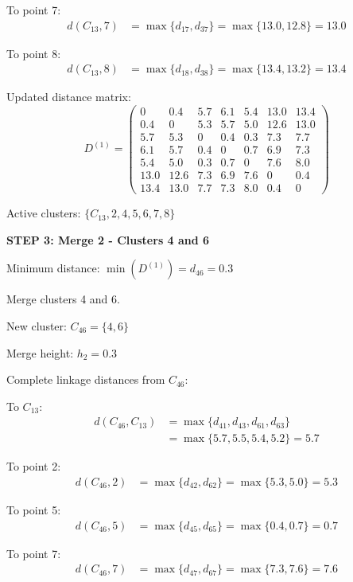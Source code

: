 \documentclass[12pt]{article}
\begin{document}
\begin{solution}
To point 7:
\begin{align*}
d(C_{13}, 7) &= \max\{d_{17}, d_{37}\} = \max\{13.0, 12.8\} = 13.0
\end{align*}

To point 8:
\begin{align*}
d(C_{13}, 8) &= \max\{d_{18}, d_{38}\} = \max\{13.4, 13.2\} = 13.4
\end{align*}

Updated distance matrix:
\[
D^{(1)} = \begin{pmatrix}
0 & 0.4 & 5.7 & 6.1 & 5.4 & 13.0 & 13.4 \\
0.4 & 0 & 5.3 & 5.7 & 5.0 & 12.6 & 13.0 \\
5.7 & 5.3 & 0 & 0.4 & 0.3 & 7.3 & 7.7 \\
6.1 & 5.7 & 0.4 & 0 & 0.7 & 6.9 & 7.3 \\
5.4 & 5.0 & 0.3 & 0.7 & 0 & 7.6 & 8.0 \\
13.0 & 12.6 & 7.3 & 6.9 & 7.6 & 0 & 0.4 \\
13.4 & 13.0 & 7.7 & 7.3 & 8.0 & 0.4 & 0
\end{pmatrix}
\]

Active clusters: $\{C_{13}, 2, 4, 5, 6, 7, 8\}$

\textbf{STEP 3: Merge 2 - Clusters 4 and 6}

Minimum distance: $\min(D^{(1)}) = d_{46} = 0.3$

Merge clusters 4 and 6.

New cluster: $C_{46} = \{4, 6\}$

Merge height: $h_2 = 0.3$

Complete linkage distances from $C_{46}$:

To $C_{13}$:
\begin{align*}
d(C_{46}, C_{13}) &= \max\{d_{41}, d_{43}, d_{61}, d_{63}\} \\
&= \max\{5.7, 5.5, 5.4, 5.2\} = 5.7
\end{align*}

To point 2:
\begin{align*}
d(C_{46}, 2) &= \max\{d_{42}, d_{62}\} = \max\{5.3, 5.0\} = 5.3
\end{align*}

To point 5:
\begin{align*}
d(C_{46}, 5) &= \max\{d_{45}, d_{65}\} = \max\{0.4, 0.7\} = 0.7
\end{align*}

To point 7:
\begin{align*}
d(C_{46}, 7) &= \max\{d_{47}, d_{67}\} = \max\{7.3, 7.6\} = 7.6
\end{align*}


\end{solution}
\end{document}
